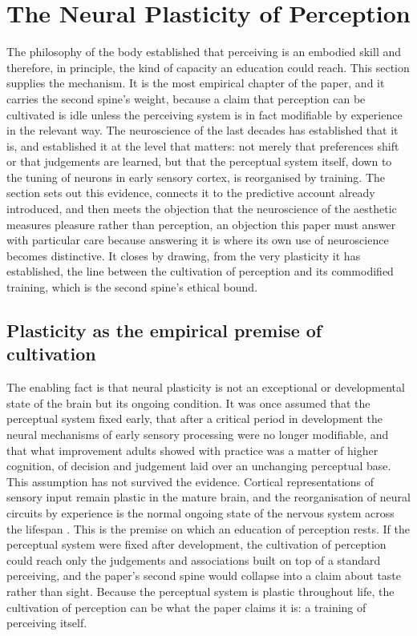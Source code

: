 \section{The Neural Plasticity of Perception}
\label{p23:sec:plasticity}

\noindent
The philosophy of the body established that perceiving is an embodied skill and therefore, in principle, the kind of capacity an education could reach. This section supplies the mechanism. It is the most empirical chapter of the paper, and it carries the second spine's weight, because a claim that perception can be cultivated is idle unless the perceiving system is in fact modifiable by experience in the relevant way. The neuroscience of the last decades has established that it is, and established it at the level that matters: not merely that preferences shift or that judgements are learned, but that the perceptual system itself, down to the tuning of neurons in early sensory cortex, is reorganised by training. The section sets out this evidence, connects it to the predictive account already introduced, and then meets the objection that the neuroscience of the aesthetic measures pleasure rather than perception, an objection this paper must answer with particular care because answering it is where its own use of neuroscience becomes distinctive. It closes by drawing, from the very plasticity it has established, the line between the cultivation of perception and its commodified training, which is the second spine's ethical bound.

\subsection{Plasticity as the empirical premise of cultivation}
\label{p23:sub:plas-premise}

The enabling fact is that neural plasticity is not an exceptional or developmental state of the brain but its ongoing condition. It was once assumed that the perceptual system fixed early, that after a critical period in development the neural mechanisms of early sensory processing were no longer modifiable, and that what improvement adults showed with practice was a matter of higher cognition, of decision and judgement laid over an unchanging perceptual base. This assumption has not survived the evidence. Cortical representations of sensory input remain plastic in the mature brain, and the reorganisation of neural circuits by experience is the normal ongoing state of the nervous system across the lifespan \parencite{gilbert2001}. This is the premise on which an education of perception rests. If the perceptual system were fixed after development, the cultivation of perception could reach only the judgements and associations built on top of a standard perceiving, and the paper's second spine would collapse into a claim about taste rather than sight. Because the perceptual system is plastic throughout life, the cultivation of perception can be what the paper claims it is: a training of perceiving itself.


